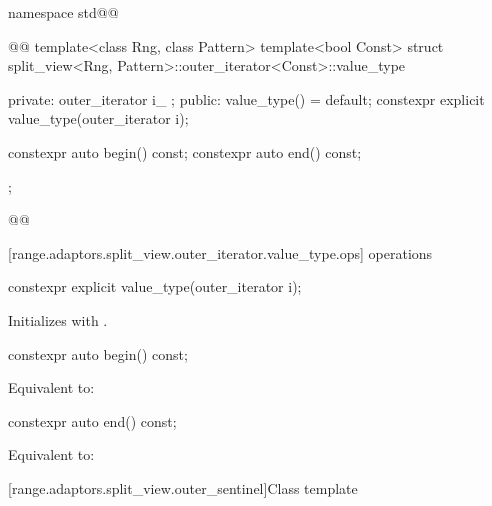 \begin{codeblock}
namespace std@@ { @@
  template<class Rng, class Pattern>
  template<bool Const>
  struct split_view<Rng, Pattern>::outer_iterator<Const>::value_type {
  private:
    outer_iterator i_ {};
  public:
    value_type() = default;
    constexpr explicit value_type(outer_iterator i);

    constexpr auto begin() const;
    constexpr auto end() const;
  };
}@\oldtxt{\}}@
\end{codeblock}

[range.adaptors.split_view.outer_iterator.value_type.ops]{ operations}

%
\begin{itemdecl}
constexpr explicit value_type(outer_iterator i);
\end{itemdecl}

\begin{itemdescr}
\pnum
\effects Initializes  with .
\end{itemdescr}

%
\begin{itemdecl}
constexpr auto begin() const;
\end{itemdecl}

\begin{itemdescr}
\pnum
\effects Equivalent to: 
\end{itemdescr}

%
\begin{itemdecl}
constexpr auto end() const;
\end{itemdecl}

\begin{itemdescr}
\pnum
\effects Equivalent to: 
\end{itemdescr}

[range.adaptors.split_view.outer_sentinel]{Class template }

\pnum
\begin{note}
\end{note}

